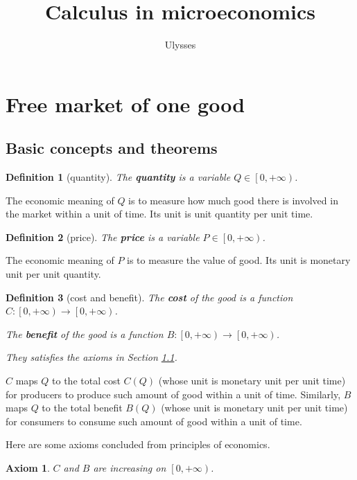 \documentclass{article}
\title{Calculus in microeconomics}
\author{Ulysses}
\newtheorem{axiom}{Axiom}
\newtheorem{definition}{Definition}
\begin{document}
\maketitle

\tableofcontents

\section{Free market of one good}

\subsection{Basic concepts and theorems}
\label{basic}

\begin{definition}[quantity]
The \textbf{quantity} is a variable $Q\in\left[0,+\infty\right)$.
\end{definition}

The economic meaning of $Q$ is to measure how much good there is involved in the market within a unit of time.
Its unit is unit quantity per unit time.

\begin{definition}[price]
The \textbf{price} is a variable $P\in\left[0,+\infty\right)$.
\end{definition}

The economic meaning of $P$ is to measure the value of good.
Its unit is monetary unit per unit quantity.

\begin{definition}[cost and benefit]
The \textbf{cost} of the good is a function $C:\left[0,+\infty\right)\to\left[0,+\infty\right)$.

The \textbf{benefit} of the good is a function $B:\left[0,+\infty\right)\to\left[0,+\infty\right)$.

They satisfies the axioms in Section \ref{basic}.
\end{definition}

$C$ maps $Q$ to the total cost $C\left(Q\right)$ (whose unit is monetary unit per unit time) for producers to produce such amount of good within a unit of time.
Similarly, $B$ maps $Q$ to the total benefit $B\left(Q\right)$ (whose unit is monetary unit per unit time) for consumers to consume such amount of good within a unit of time.

Here are some axioms concluded from principles of economics.

\begin{axiom}
\label{monoticity}
$C$ and $B$ are increasing on $\left[0,+\infty\right)$.
\end{axiom}
\end{document}
